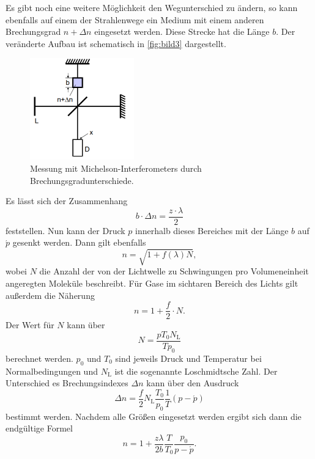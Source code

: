 Es gibt noch eine weitere Möglichkeit den Wegunterschied zu ändern, so kann ebenfalls auf einem der Strahlenwege ein Medium mit einem anderen Brechungsgrad $n + \Delta n$ eingesetzt werden.
Diese Strecke hat die Länge $b$. 
Der veränderte Aufbau ist schematisch in \autoref{fig:bild3} dargestellt.

\begin{figure}
    \centering
    \includegraphics[width=0.4\textwidth]{images/bild3.png}
    \caption{Messung mit Michelson-Interferometers durch Brechungsgradunterschiede.\cite{V401}}
    \label{fig:bild3}
\end{figure}

Es lässt sich der Zusammenhang 
\begin{equation}
    b \cdot \Delta n = \frac{z \cdot \lambda}{2}
\end{equation}
feststellen.
Nun kann der Druck $p$ innerhalb dieses Bereiches mit der Länge $b$ auf $\acute{p}$ gesenkt werden.
Dann gilt ebenfalls
\begin{equation}
    n = \sqrt{1 + f(\lambda)N},
\end{equation}
wobei $N$ die Anzahl der von der Lichtwelle zu Schwingungen pro Volumeneinheit angeregten Moleküle beschreibt.
Für Gase im sichtaren Bereich des Lichts gilt außerdem die Näherung
\begin{equation}
    n = 1 + \frac{f}{2} \cdot N.
\end{equation}
Der Wert für $N$ kann über
\begin{equation}
    N = \frac{p T_0 N_\text{L}}{T p_0}
\end{equation}
berechnet werden.
$p_0$ und $T_0$ sind jeweils Druck und Temperatur bei Normalbedingungen und $N_\text{L}$ ist die sogenannte  Loschmidtsche Zahl.
Der Unterschied es Brechungsindexes $\Delta n$ kann über den Ausdruck
\begin{equation}
    \Delta n = \frac{f}{2} N_\text{L} \frac{T_0}{p_0} \frac{1}{T} (p - \acute{p})
\end{equation}
bestimmt werden.
Nachdem alle Größen eingesetzt werden ergibt sich dann die endgültige Formel
\begin{equation}
    n = 1 + \frac{z \lambda}{2  b } \frac{T}{T_0} \frac{p_0}{p - \acute{p}}.
\end{equation}